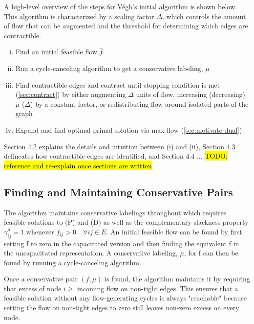 \documentclass[11pt]{article}
\theoremstyle{definition}
\newtheorem{definition}{Definition}[section]
\theoremstyle{definition}
\theoremstyle{definition}
\newcommand{\giij}{\gamma_{ij}^{\mu}}
\renewcommand{\todo}[1]{\hl{TODO: #1}}
\begin{document}
A high-level overview of the steps for Végh's initial algorithm \cite{Vegh2013} is shown below. This algorithm is characterized by a scaling factor $\Delta$, which controls the amount of flow that can be augmented and the threshold for determining which edges are contractible. 

\begin{enumerate}[(i),itemsep=0mm]
\item Find an initial feasible flow $\bar{f}$
\item Run a cycle-canceling algorithm to get a conservative labeling, $\mu$ 
\item Find contractible edges and contract until stopping condition is met (\ref{sec:contract}) by either augmenting $\Delta$ units of flow, increasing (decreasing) $\mu$ ($\Delta$) by a constant factor, or redistributing flow around isolated parts of the graph
\item Expand and find optimal primal solution via max flow (\ref{sec:motivate-dual})
\end{enumerate}



Section 4.2 explains the details and intuition between (i) and (ii), Section 4.3 delineates how contractible edges are identified, and Section 4.4 ... \todo{reference and re-explain once sections are written}

\subsection{Finding and Maintaining Conservative Pairs}
The algorithm maintains conservative labelings throughout which requires feasible solutions to (P) and (D) as well as the complementary-slackness property $\giij=1$ whenever $f_{ij}>0 \quad \forall ij \in E$. An initial feasible flow can be found by first setting f to zero in the capacitated version and then finding the equivalent f in the uncapacitated representation. A conservative labeling, $\mu$, for f can then be found by running a cycle-canceling algorithm. 

Once a conservative pair $(f, \mu)$ is found, the algorithm maintains it by requiring that excess of node $i \geq$ incoming flow on non-tight edges. This ensures that a feasible solution without any flow-generating cycles is always "reachable" because setting the flow on non-tight edges to zero still leaves non-zero excess on every node. 
\end{document}
